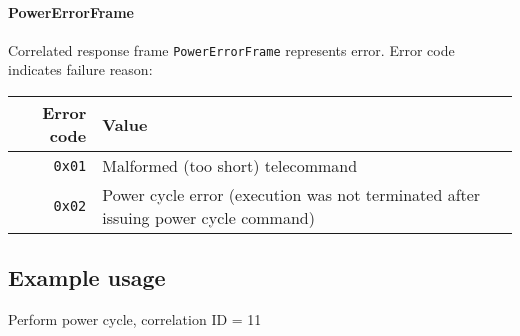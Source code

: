 \paragraph{PowerErrorFrame}
Correlated response frame \texttt{PowerErrorFrame} represents error. Error code indicates failure reason:

\begin{tabular}{r | l}
	Error code & Value \\
	\hline
	\texttt{0x01} & Malformed (too short) telecommand \\
	\texttt{0x02} & Power cycle error (\OBC execution was not terminated after issuing power cycle command) \\
	
\end{tabular}

\subsection{Example usage}
Perform power cycle, correlation ID = 11

